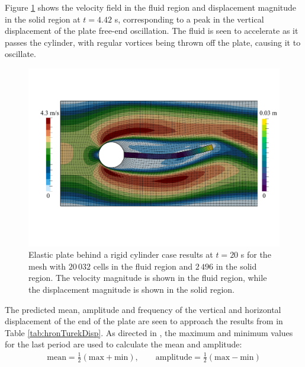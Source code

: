 \documentclass[sn-mathphys,Numbered]{sn-jnl}%
\begin{document}
Figure \ref{fig:hronTurek-results} shows the velocity field in the fluid region and displacement magnitude in the solid region at $t = 4.42$ s, corresponding to a peak in the vertical displacement of the plate free-end oscillation.
The fluid is seen to accelerate as it passes the cylinder, with regular vortices being thrown off the plate, causing it to oscillate.
\begin{figure}[htbp]
   \centering
	   \includegraphics[width=\textwidth]{figures/hronTurek-results} 
   \caption{Elastic plate behind a rigid cylinder case results at $t = 20$ s for the mesh with $20\,032$ cells in the fluid region and $2\,496$ in the solid region. The velocity magnitude is shown in the fluid region, while the displacement magnitude is shown in the solid region.}
   \label{fig:hronTurek-results}
\end{figure}
The predicted mean, amplitude and frequency of the vertical and horizontal displacement of the end of the plate are seen to approach the results from \citet{Turek2006} in Table \ref{tab:hronTurekDisp}.
As directed in \citet{Turek2006}, the maximum and minimum values for the last period are used to calculate the mean and amplitude:
\begin{eqnarray}
	\text{mean} = \frac{1}{2}(\text{max} + \text{min}), \quad\quad
	\text{amplitude} = \frac{1}{2}(\text{max} - \text{min})
\end{eqnarray}
\end{document}
